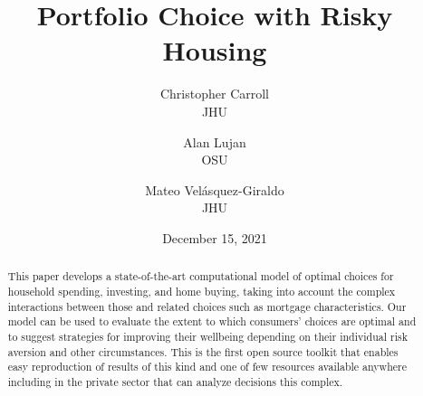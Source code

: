 \documentclass[PortfolioChoiceWithRiskyHousing]{subfiles}
\begin{document}
\providecommand{\versn}{pdf} %
\ifthenelse{\boolean{Web}}{ %
  \renewcommand{\versn}{Web} %
  \renewcommand{\rootFromOut}{.} %
}{} %


\title{Portfolio Choice with Risky Housing}

\author{
  {\small Christopher Carroll\authNum} \\ {\small JHU}
  \and
  {\small Alan Lujan\authNum} \\ {\small OSU}
  \and
  {\small Mateo Vel\'asquez-Giraldo\authNum} \\ {\small JHU}
}



\renewcommand{\forcedate}{December 15, 2021}\date{\forcedate}

\maketitle
\hypertarget{abstract}{}
\begin{abstract}
  This paper develops a state-of-the-art computational model of optimal choices for household spending, investing, and home buying, taking into account the complex interactions between those and related choices such as mortgage characteristics. Our model can be used to evaluate the extent to which consumers' choices are optimal and to suggest strategies for improving their wellbeing depending on their individual risk aversion and other circumstances. This is the first open source toolkit that enables easy reproduction of results of this kind and one of few resources available anywhere including in the private sector that can analyze decisions this complex.  
\end{abstract}
\end{document}
